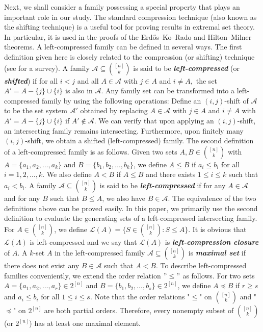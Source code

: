 \documentclass[reqno,english]{amsart}
\theoremstyle{plain}
\theoremstyle{remark}
\newcommand{\0}[0]{\emptyset}
\renewcommand{\1}[0]{\textbf{1}}
\theoremstyle{plain}
\theoremstyle{remark}
\renewcommand{\1}[0]{\textbf{1}}
\begin{document}
Next, we shall consider a family possessing a special property that plays an important role in our study. {The standard compression technique (also known as the shifting technique) is a useful tool for proving results in extremal set theory. In particular, it is used in the proofs of the Erdős–Ko–Rado and Hilton–Milner theorems. A left-compressed family can be defined in several ways. The first definition given here is closely related to the compression (or shifting) technique (see \cite{Fr87} for a survey). A family $\mathcal{A}\subseteq \binom{[n]}{k}$ is said to be {\bf\emph{left-compressed}} (or {\bf\emph{shifted}}) if for all $i<j$ and all $A\in \mathcal{A}$ with $j\in A$ and $i\neq A,$ the set $A'=A-\{j\}\cup \{i\}$ is also in $\mathcal{A}$.  Any family set can be transformed into a left-compressed family  by using the following operations: Define an $(i,j)$-shift of $\mathcal{A}$ to be the set system $\mathcal{A'}$ obtained by replacing $A\in \mathcal{A}$ with $j\in A$ and $i\neq A$ with $A'=A-\{j\}\cup\{i\}$ if $A'\notin \mathcal{A}.$ We can verify that upon applying an $(i,j)$-shift, an intersecting family remains intersecting. Furthermore, upon finitely many $(i,j)$-shift, we obtain a shifted (left-compressed) family. The second definition of a left-compressed family is as follows. Given two sets $A,B \in \binom{[n]}{k}$ with $A=\{a_{1},a_{2},\ldots,a_{k} \}$ and $B=\{b_{1},b_{2},\ldots,b_{k}\}$, we define $A \leq B$ if $a_{i} \leq b_{i}$ for all $i=1,2,\ldots,k$. We also define $A < B$ if $A \leq B$ and there exists $1 \leq i \leq k$ such that $a_{i} < b_{i}$. 
A family $\mathcal{A} \subseteq \binom{[n]}{k}$ is said to be {\bf\emph{left-compressed}} if for any $A \in \mathcal{A}$ and for any $ B$ such that $B \leq A$, we also have $B \in \mathcal{A}$. The equivalence of the two definitions above can be proved easily. In this paper, we primarily use the second definition to evaluate the generating sets of a left-compressed intersecting family.} For $A \in \binom{[n]}{k}$, we define $\mathcal{L}(A)=\{S \in \binom{[n]}{k}: S \leq A\}$. It is obvious that $\mathcal{L}(A)$ is left-compressed and we say that $\mathcal{L}(A)$ is {\bf \emph{ left-compression
closure }}  of $A$. A $k$-set $A$ in the left-compressed family $\mathcal{A} \subseteq \binom{[n]}{k}$ is {\bf \emph{ maximal set}} if there does not exist any $B \in \mathcal{A}$ such that $A < B$. To describe left-compressed families conveniently, we extend the order relation $"\leq"$ as follows.
For two sets $A=\{a_{1},a_{2},\ldots,a_{r}\} \in 2^{[n]}$ and $B=\{b_{1},b_{2},\ldots,b_{s} \} \in 2^{[n]}$, we define $A \preceq B$ if  $r \geq s$ and $a_{i} \leq b_{i}$ for all $1 \leq i \leq s$. Note that the order relations "$\leq$" on $\binom{[n]}{k}$ and "$\preceq$" on $2^{[n]}$ are both partial orders. Therefore, every nonempty subset of $\binom{[n]}{k}$ (or $2^{[n]}$) has at least one maximal element.\\ \\
\end{document}
